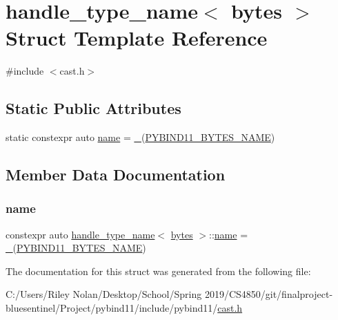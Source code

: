 \hypertarget{structhandle__type__name_3_01bytes_01_4}{}\section{handle\+\_\+type\+\_\+name$<$ bytes $>$ Struct Template Reference}
\label{structhandle__type__name_3_01bytes_01_4}


{\ttfamily \#include $<$cast.\+h$>$}

\subsection*{Static Public Attributes}
\begin{DoxyCompactItemize}
\item 
static constexpr auto \mbox{\hyperlink{structhandle__type__name_3_01bytes_01_4_aaf95bf00e0d8e8cb1d30815b23716cec}{name}} = \mbox{\hyperlink{descr_8h_af114703e20c6527e87163eb2798f74b8}{\+\_\+}}(\mbox{\hyperlink{detail_2common_8h_aa4f09eb05629a1d670f0347e6fdf3f29}{P\+Y\+B\+I\+N\+D11\+\_\+\+B\+Y\+T\+E\+S\+\_\+\+N\+A\+ME}})
\end{DoxyCompactItemize}


\subsection{Member Data Documentation}
\mbox{\label{structhandle__type__name_3_01bytes_01_4_aaf95bf00e0d8e8cb1d30815b23716cec}} 
\subsubsection{\texorpdfstring{name}{name}}
{\footnotesize\ttfamily constexpr auto \mbox{\hyperlink{structhandle__type__name}{handle\+\_\+type\+\_\+name}}$<$ \mbox{\hyperlink{classbytes}{bytes}} $>$\+::\mbox{\hyperlink{structname}{name}} = \mbox{\hyperlink{descr_8h_af114703e20c6527e87163eb2798f74b8}{\+\_\+}}(\mbox{\hyperlink{detail_2common_8h_aa4f09eb05629a1d670f0347e6fdf3f29}{P\+Y\+B\+I\+N\+D11\+\_\+\+B\+Y\+T\+E\+S\+\_\+\+N\+A\+ME}})\hspace{0.3cm}{\ttfamily [static]}}



The documentation for this struct was generated from the following file\+:\begin{DoxyCompactItemize}
\item 
C\+:/\+Users/\+Riley Nolan/\+Desktop/\+School/\+Spring 2019/\+C\+S4850/git/finalproject-\/bluesentinel/\+Project/pybind11/include/pybind11/\mbox{\hyperlink{cast_8h}{cast.\+h}}\end{DoxyCompactItemize}
